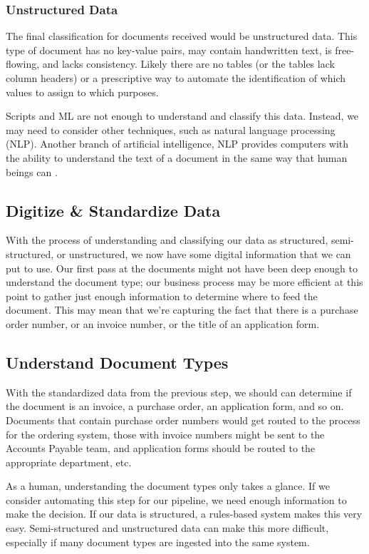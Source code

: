 \documentclass[conference, draftcls]{IEEEtran}
\begin{document}
\subsubsection{Unstructured Data}
The final classification for documents received would be unstructured data. This type of document has no key-value pairs, may contain handwritten text, is free-flowing, and lacks consistency. Likely there are no tables (or the tables lack column headers) or a prescriptive way to automate the identification of which values to assign to which purposes.

Scripts and ML are not enough to understand and classify this data. Instead, we may need to consider other techniques, such as natural language processing (NLP). Another branch of artificial intelligence, NLP provides computers with the ability to understand the text of a document in the same way that human beings can \cite{ibm:nlp}.

\subsection{Digitize \& Standardize Data}
With the process of understanding and classifying our data as structured, semi-structured, or unstructured, we now have some digital information that we can put to use. Our first pass at the documents might not have been deep enough to understand the document type; our business process may be more efficient at this point to gather just enough information to determine where to feed the document. This may mean that we're capturing the fact that there is a purchase order number, or an invoice number, or the title of an application form. 

\subsection{Understand Document Types}
With the standardized data from the previous step, we should can determine if the document is an invoice, a purchase order, an application form, and so on. Documents that contain purchase order numbers would get routed to the process for the ordering system, those with invoice numbers might be sent to the Accounts Payable team, and application forms should be routed to the appropriate department, etc.

As a human, understanding the document types only takes a glance. If we consider automating this step for our pipeline, we need enough information to make the decision. If our data is structured, a rules-based system makes this very easy. Semi-structured and unstructured data can make this more difficult, especially if many document types are ingested into the same system. 
\end{document}
